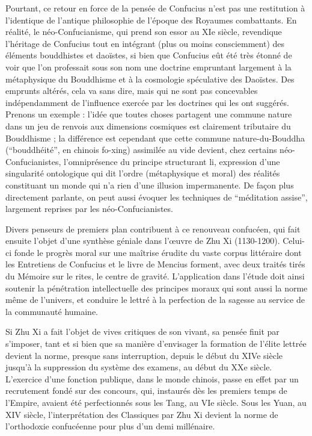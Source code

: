 \documentclass[11pt,a4paper]{article} %
\begin{document}
Pourtant, ce retour en force de la pensée de Confucius n'est pas une restitution à
l'identique de l'antique philosophie de l'époque des Royaumes combattants.
En réalité,
le néo-Confucianisme, qui prend son essor au XIe siècle, revendique l'héritage de
Confucius tout en intégrant (plus ou moins consciemment) des éléments bouddhistes et
daoïstes, si bien que Confucius eût été très étonné de voir que l'on professait sous son
nom une doctrine empruntant largement à la métaphysique du Bouddhisme et à la cosmologie spéculative des Daoïstes.
Des emprunts altérés, cela va sans dire, mais qui ne
sont pas concevables indépendamment de l'influence exercée par les doctrines qui les
ont suggérés.
Prenons un exemple : l'idée que toutes choses partagent une commune
nature dans un jeu de renvois aux dimensions cosmiques est clairement tributaire du
Bouddhisme ; la différence est cependant que cette commune nature-du-Bouddha
(``bouddhéité'', en chinois fo-xing) assimilée au vide devient, chez certains néo-Confucianistes, l'omniprésence du principe structurant li, expression d'une singularité
ontologique qui dit l'ordre (métaphysique et moral) des réalités constituant un monde
qui n'a rien d'une illusion impermanente.
De façon plus directement parlante, on peut
aussi évoquer les techniques de ``méditation assise'', largement reprises par les néo-Confucianistes.

Divers penseurs de premiers plan contribuent à ce renouveau confucéen, qui fait ensuite
l'objet d'une synthèse géniale dans l'œuvre de Zhu Xi (1130-1200).
Celui-ci fonde le
progrès moral sur une maîtrise érudite du vaste corpus littéraire dont les Entretiens de
Confucius et le livre de Mencius forment, avec deux traités tirés du Mémoire sur le rites,
le centre de gravité.
L'application dans l'étude doit ainsi soutenir la pénétration intellectuelle des principes moraux qui sont aussi la norme même de l'univers, et conduire le
lettré à la perfection de la sagesse au service de la communauté humaine.

Si Zhu Xi a fait l'objet de vives critiques de son vivant, sa pensée finit par s'imposer,
tant et si bien que sa manière d'envisager la formation de l'élite lettrée devient la norme,
presque sans interruption, depuis le début du XIVe siècle jusqu'à la suppression du système des examens, au début du XXe siècle.
L'exercice d'une fonction publique, dans le
monde chinois, passe en effet par un recrutement fondé sur des concours, qui, instaurés
dès les premiers temps de l'Empire, avaient été perfectionnés sous les Tang, au VIe siècle.
Sous les Yuan, au XIV siècle, l'interprétation des Classiques par Zhu Xi devient la
norme de l'orthodoxie confucéenne pour plus d'un demi millénaire.
\end{document}

